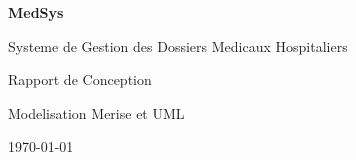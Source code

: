 \documentclass[12pt,a4paper]{report}
\begin{document}
\begin{titlepage}
  \centering
  \vspace*{2cm}
  {\Huge\bfseries MedSys\par}
  \vspace{0.5cm}
  {\Large Systeme de Gestion des Dossiers Medicaux Hospitaliers\par}
  \vspace{2cm}
  {\large Rapport de Conception\par}
  \vspace{1cm}
  {\large Modelisation Merise et UML\par}
  \vfill
  {\large \today\par}
\end{titlepage}

\tableofcontents
\newpage



\end{document}

